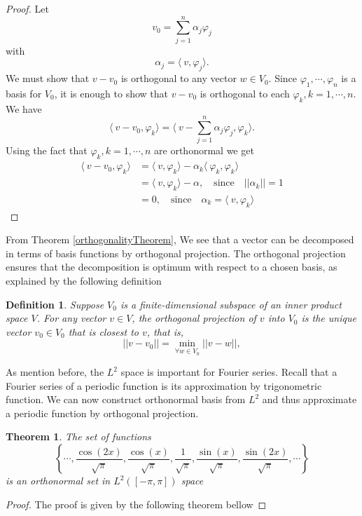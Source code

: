 \documentclass[11pt, oneside]{article}   	%
\newtheorem{theorem}{Theorem}
\newtheorem{definition}{Definition}
\newtheorem{proof}{Proof}
\begin{document}
\begin{proof}
Let 
\begin{equation}
v_{0} = \sum_{j=1}^{n}\alpha_{j}\varphi_{j} \nonumber
\end{equation}
with 
\begin{equation}
\alpha_{j}  = \langle\ v,\varphi_{j} \rangle.  \nonumber
\end{equation}
We must show that $v-v_{0}$ is orthogonal to any vector $w \in V_{0}$. Since $\varphi_{1}, \cdots, \varphi_{n}$ is a basis for $V_{0}$, it is enough to show that $v-v_{0}$ is orthogonal to each 
$\varphi_{k}, k = 1, \cdots, n$.
\justify
We have
\begin{equation}
\langle\ v-v_{0},\varphi_{k} \rangle = \langle\ v-\sum_{j=1}^{n}\alpha_{j}\varphi_{j},\varphi_{k} \rangle.
\end{equation}
Using the fact that $\varphi_{k}, k = 1, \cdots, n$ are orthonormal we get
\begin{equation}
\begin{split}
\langle\ v-v_{0},\varphi_{k} \rangle &= \langle\ v,\varphi_{k} \rangle -\alpha_{k}\langle\ \varphi_{k},\varphi_{k} \rangle \\
&=\langle\ v,\varphi_{k} \rangle -\alpha, \quad \text{since} \quad || \alpha_{k}|| = 1\\
&=0, \quad \text{since} \quad \alpha_{k} = \langle\ v,\varphi_{k} \rangle \nonumber
\end{split}
\end{equation}
\end{proof}
\justify
From Theorem \ref{orthogonalityTheorem}, We see that a vector can be decomposed in terms of basis functions by orthogonal projection. The orthogonal projection ensures that the decomposition is optimum with respect to a chosen basis, as explained by the following definition
\begin{definition}
Suppose $V_{0}$ is a finite-dimensional subspace of an inner product space $V$. For any vector $v \in V$, the orthogonal projection of $v$
into $V_{0}$ is the unique vector $v_{0} \in V_{0}$ that is closest to $v$, that is,
\begin{equation}
 ||v-v_{0}|| =  \min_{\forall w \in V_{0}} || v-w ||,
\end{equation}
\end{definition}
\justify
As mention before, the $L^{2}$ space is important for Fourier series. Recall that a Fourier series of a periodic function is its approximation by trigonometric function. We can now construct orthonormal basis from $L^{2}$ and thus approximate a periodic function by orthogonal projection.
\begin{theorem}
The set of functions 
\begin{equation}
\left \{ \cdots, \frac{\cos(2x)}{\sqrt{\pi}},\frac{\cos(x)}{\sqrt{\pi}},\frac{1}{\sqrt{\pi}}, \frac{\sin(x)}{\sqrt{\pi}},\frac{\sin(2x)}{\sqrt{\pi}},\cdots  \right \}
\end{equation}
is an orthonormal set in $L^{2}([-\pi,\pi])$ space
\end{theorem}
\begin{proof}
The proof is given by the following theorem bellow
\end{proof}
\end{document}
